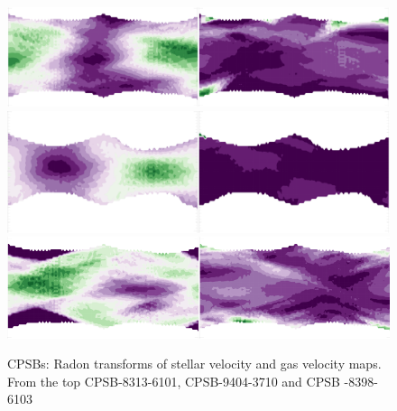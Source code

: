 

\begin{figure}
    \centering
    \includegraphics[width=\columnwidth]{images/RadonPlots/RT-snips/CPSB-8313-6101-RT-snip.png}
    \includegraphics[width=\columnwidth]{images/RadonPlots/RT-snips/CPSB-9494-3701-RT-snip.png}
    \includegraphics[width=\columnwidth]{images/RadonPlots/RT-snips/CPSB-8398-6102-RT-snip.png}
    \caption{CPSBs: Radon transforms of stellar velocity and gas velocity maps. From the top CPSB-8313-6101, CPSB-9404-3710 and CPSB -8398-6103}
    \label{fig:CPSB-RTs}
\end{figure}

